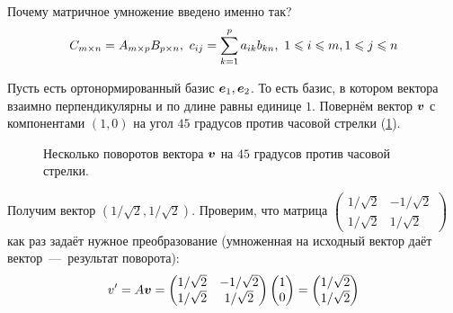 \documentclass[a4paper,12pt]{article}
\theoremstyle{remark}
\begin{document}
  \begin{remark}
    Почему матричное умножение введено именно так?
    \[
      C_{m\times n} \hm= A_{m\times p}B_{p\times n},\ c_{ij} \hm= \sum\limits_{k=1}^p a_{ik} b_{kn},\ 1 \hm\leq i \hm\leq m, 1 \hm\leq j \hm\leq n
    \]
    
    Пусть есть ортонормированный базис $\boldsymbol e_1, \boldsymbol e_2$.
    То есть базис, в котором вектора взаимно перпендикулярны и по длине равны единице $1$.
    Повернём вектор $\boldsymbol v$ с компонентами $(1, 0)$ на угол $45$ градусов против часовой стрелки (\ref{fig:turning-vector}).
    
    \begin{figure}[h]
      \centering
      
      
      \caption{Несколько поворотов вектора $\boldsymbol v$ на $45$ градусов против часовой стрелки.}
      \label{fig:turning-vector}
    \end{figure}
    
    Получим вектор $\left(1/\sqrt{2}, 1/\sqrt{2}\right)$.
    Проверим, что матрица $\left(\begin{smallmatrix}1/\sqrt{2} & -1/\sqrt{2}\\ 1/\sqrt{2} & 1/\sqrt{2}\end{smallmatrix}\right)$ как раз задаёт нужное преобразование (умноженная на исходный вектор даёт вектор~---~результат поворота):
    \[
      v'
      = A \boldsymbol v
      = \begin{pmatrix}
          1/\sqrt{2} & -1/\sqrt{2}\\
          1/\sqrt{2} & 1/\sqrt{2}
        \end{pmatrix}
        \begin{pmatrix}
          1 \\ 0
        \end{pmatrix}
      = \begin{pmatrix}
          1/\sqrt{2} \\ 1/\sqrt{2}
        \end{pmatrix}
    \]
    

\end{remark}
\end{document}
